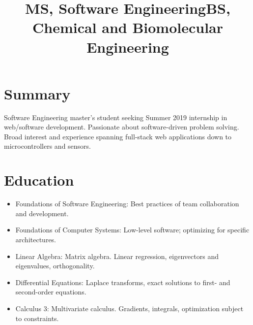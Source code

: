 \documentclass[12pt]{res} %
\begin{document}
    \begin{resume}
 
      \section{Summary}
      Software Engineering master's student seeking Summer 2019 internship in web/software development.
      Passionate about software-driven problem solving.
      Broad interest and experience spanning full-stack web applications down to microcontrollers and sensors.
      \vspace{-12pt}

      \section{Education}

          \title{\textbf{MS, Software Engineering}}
          \begin{position}
              \vspace{-14pt}
              \begin{itemize}[leftmargin=-0.4cm]
              \itemsep0em
              \item Foundations of Software Engineering: Best practices of team collaboration and development.
              \item Foundations of Computer Systems: Low-level software; optimizing for specific architectures.
              \end{itemize}
          \end{position}
          \vspace{-12pt}

          \title{\textbf{BS, Chemical and Biomolecular Engineering}}
          \begin{position}
            \vspace{-14pt}
            \begin{itemize}[leftmargin=-0.4cm]
            \itemsep0em
            \item Linear Algebra: Matrix algebra. Linear regression, eigenvectors and eigenvalues, orthogonality.
            \item Differential Equations: Laplace transforms, exact solutions to first- and second-order equations.
            \item Calculus 3: Multivariate calculus. Gradients, integrals, optimization subject to constraints.
            \end{itemize}
          \end{position}
          \vspace{-12pt}


\end{resume}
\end{document}
